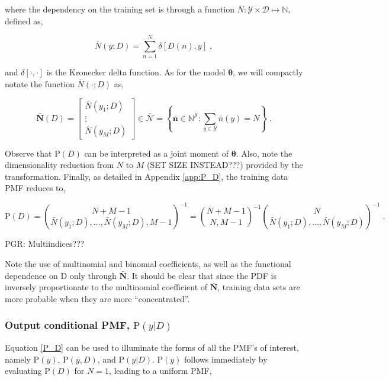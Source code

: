 \documentclass[12pt]{report}
\begin{document}
where the dependency on the training set is through a function $\bar{N} : \mathcal{Y} \times \mathcal{D} \mapsto \mathbb{N}$, defined as,

\begin{equation}
\bar{N}(y;D) = \sum_{n=1}^N \delta[D(n),y] \;,
\end{equation}

and $\delta[\cdot,\cdot]$ is the Kronecker delta function. As for the model $\bm{\theta}$, we will compactly notate the function $\bar{N}(\cdot;D)$ as,

\begin{equation}
\bar{\bm{N}}(D) = \begin{bmatrix} \bar{N}(y_1;D) \\ \vdots \\ \bar{N}(y_M;D) \end{bmatrix} \in \bar{\mathcal{N}}
= \left\{ \bar{\bm{n}} \in \mathbb{N}^\mathcal{Y}: \sum_{y \in \mathcal{Y}} \bar{n}(y) = N \right\} \;.
\end{equation}



Observe that $\text{P}(D)$ can be interpreted as a joint moment of $\bm{\theta}$. Also, note the dimensionality reduction from $N$ to $M$ (SET SIZE INSTEAD???) provided by the transformation. Finally, as detailed in Appendix \ref{app:P_D}, the training data PMF reduces to,

\begin{equation} \label{P_D}
\text{P}(D) = \binom{N+M-1}{\bar{N}(y_1;D),\ldots,\bar{N}(y_M;D),M-1}^{-1} 
= \binom{N+M-1}{N,M-1}^{-1} \binom{N}{\bar{N}(y_1;D),\ldots,\bar{N}(y_M;D)}^{-1} \;.
\end{equation}

PGR: Multiindices???

Note the use of multinomial and binomial coefficients, as well as the functional dependence on $\mathrm{D}$ only through $\bar{\bm{N}}$. It should be clear that since the PDF is inversely proportionate to the multinomial coefficient of $\bar{\bm{N}}$, training data sets are more probable when they are more ``concentrated''. 





\subsubsection{Output conditional PMF, $\text{P}(y | D)$}

Equation \eqref{P_D} can be used to illuminate the forms of all the PMF's of interest, namely $\text{P}(y)$, $\text{P}(y,D)$, and $\text{P}(y | D)$.  $\text{P}(y)$ follows immediately by evaluating $\text{P}(D)$ for $N=1$, leading to a uniform PMF,
\end{document}
